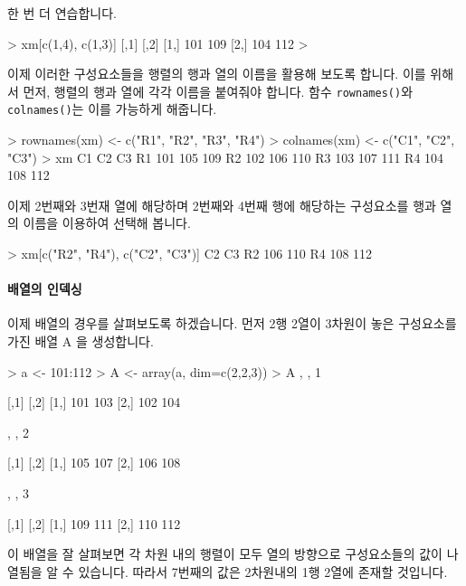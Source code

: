 한 번 더 연습합니다.

\begin{Schunk}
\begin{Soutput}
> xm[c(1,4), c(1,3)]
     [,1] [,2]
[1,]  101  109
[2,]  104  112
> 
\end{Soutput}
\end{Schunk}

이제 이러한 구성요소들을 행렬의 행과 열의 이름을 활용해 보도록 합니다. 
이를 위해서 먼저, 행렬의 행과 열에 각각 이름을 붙여줘야 합니다. 
함수 \texttt{rownames()}와 \texttt{colnames()}는 이를 가능하게 해줍니다.

\begin{Schunk}
\begin{Soutput}
> rownames(xm) <- c("R1", "R2", "R3", "R4")
> colnames(xm) <- c("C1", "C2", "C3")
> xm
    C1  C2  C3
R1 101 105 109
R2 102 106 110
R3 103 107 111
R4 104 108 112
\end{Soutput}
\end{Schunk}

이제 2번째와 3번재 열에 해당하며 2번째와 4번째 행에 해당하는 구성요소를 행과 열의 이름을 이용하여 선택해 봅니다. 

\begin{Schunk}
\begin{Soutput}
> xm[c("R2", "R4"), c("C2", "C3")]
    C2  C3
R2 106 110
R4 108 112
\end{Soutput}
\end{Schunk}


\paragraph{배열의 인덱싱} 이제 배열의 경우를 살펴보도록 하겠습니다. 
먼저 2행 2열이 3차원이 놓은 구성요소를 가진 배열 A 을 생성합니다.

\begin{Schunk}
\begin{Soutput}
> a <- 101:112
> A <- array(a, dim=c(2,2,3))
> A
, , 1

     [,1] [,2]
[1,]  101  103
[2,]  102  104

, , 2

     [,1] [,2]
[1,]  105  107
[2,]  106  108

, , 3

     [,1] [,2]
[1,]  109  111
[2,]  110  112

\end{Soutput}
\end{Schunk}

이 배열을 잘 살펴보면 각 차원 내의 행렬이 모두 열의 방향으로 구성요소들의 값이 나열됨을 알 수 있습니다. 
따라서 7번째의 값은 2차원내의 1행 2열에 존재할 것입니다. 

